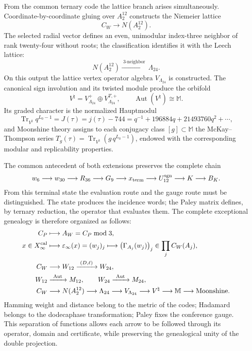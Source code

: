 From the common ternary code the lattice branch arises simultaneously. Coordinate-by-coordinate
gluing over \(A_2^{12}\) constructs the Niemeier
lattice
\[
 C_W\longrightarrow N(A_2^{12}).
\]
The selected radial vector defines an even, unimodular index-three neighbor
of rank twenty-four without roots; the classification identifies it
with the Leech lattice:
\[
 N(A_2^{12})\xrightarrow{\;3\text{-neighbor}\;}\Lambda_{24}.
\]
On this output the lattice vertex operator algebra
\(V_{\Lambda_{24}}\) is constructed. The canonical sign involution and its twisted module
produce the orbifold
\[
 V^\natural=V_{\Lambda_{24}}^+
 \oplus V_{\Lambda_{24}}^{T,+},
 \qquad
 \operatorname{Aut}(V^\natural)\cong\mathbb M.
\]
Its graded character is the normalized Hauptmodul
\[
 \operatorname{Tr}_{V^\natural}q^{L_0-1}
 =J(\tau)=j(\tau)-744
 =q^{-1}+196884q+21493760q^2+\cdots,
\]
and Moonshine theory assigns to each conjugacy class
\([g]\subset\mathbb M\) the McKay--Thompson series
\(T_g(\tau)=\operatorname{Tr}_{V^\natural}
(g\,q^{L_0-1})\), endowed with the corresponding modular and replicability
properties.

The common antecedent of both extensions preserves the complete chain
\[
 w_6\longrightarrow w_{30}\longrightarrow R_{36}\longrightarrow G_9
 \longrightarrow x_{\rm term}\longrightarrow U_{12}^{\rm sgn}
 \longrightarrow K\longrightarrow B_K.
\]
From this terminal state the evaluation route and the gauge route must be
distinguished. The state produces the incidence words; the Paley matrix
defines, by ternary reduction, the operator that evaluates them. The complete
exceptional genealogy is therefore organized as follows:
\[
\begin{aligned}
C_P&\longmapsto A_W=C_P\bmod3,\\
x\in X_\infty^{\rm cal}
&\longmapsto \varepsilon_\infty(x)=(w_j)_j
 \longmapsto\bigl(\Gamma_{A_j}(w_j)\bigr)_j
 \in\prod_j C_W(A_j),\\
C_W
&\longrightarrow W_{12}\xrightarrow{\ (D,\ell)\ }W_{24},\\
W_{12}&\xrightarrow{\ \operatorname{Aut}\ }M_{12},
\qquad W_{24}\xrightarrow{\ \operatorname{Aut}\ }M_{24},\\
C_W
&\longrightarrow N(A_2^{12})\longrightarrow\Lambda_{24}
 \longrightarrow V_{\Lambda_{24}}\longrightarrow V^\natural
 \longrightarrow\mathbb M\longrightarrow\text{Moonshine}.
\end{aligned}
\]
Hamming weight and distance belong to the metric of the codes;
Hadamard belongs to the dodecaphase transformation; Paley fixes the conference
gauge. This separation of functions allows each arrow to be followed through
its operator, domain and certificate, while preserving the genealogical
unity of the double projection.
